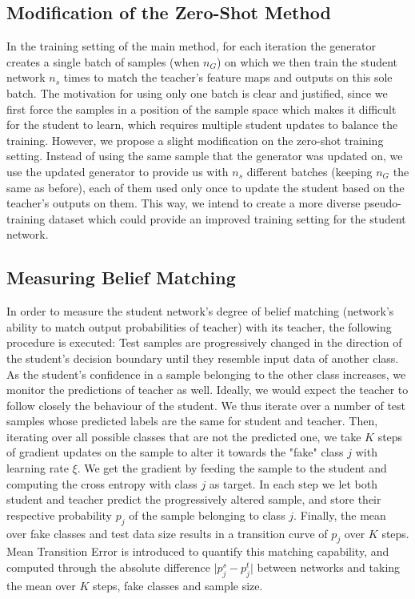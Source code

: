 \subsection{Modification of the Zero-Shot Method}\label{own}

In the training setting of the main method, for each iteration the generator creates a single batch of samples (when $n_G$) on which we then train the student network $n_s$ times to match the teacher's feature maps and outputs on this sole batch. The motivation for using only one batch is clear and justified, since we first force the samples in a position of the sample space which makes it difficult for the student to learn, which requires multiple student updates to balance the training. However, we propose a slight modification on the zero-shot training setting. Instead of using the same sample that the generator was updated on, we use the updated generator to provide us with $n_s$ different batches (keeping $n_G$ the same as before), each of them used only once to update the student based on the teacher's outputs on them. This way, we intend to create a more diverse pseudo-training dataset which could provide an improved training setting for the student network.    

\subsection{Measuring Belief Matching}\label{abm}

In order to measure the student network's degree of belief matching (network's ability to match output probabilities of teacher) with its teacher, the following procedure is executed: Test samples are progressively changed in the direction of the student's decision boundary until they resemble input data of another class. As the student's confidence in a sample belonging to the other class increases, we monitor the predictions of teacher as well. Ideally, we would expect the teacher to follow closely the behaviour of the student. We thus iterate over a number of test samples whose predicted labels are the same for student and teacher. Then, iterating over all possible classes that are not the predicted one, we take $K$ steps of gradient updates on the sample to alter it towards the "fake" class $j$ with learning rate $\xi$. We get the gradient by feeding the sample to the student and computing the cross entropy with class $j$ as target. In each step we let both student and teacher predict the progressively altered sample, and store their respective probability $p_j$ of the sample belonging to class $j$. Finally, the mean over fake classes and test data size results in a transition curve of $p_j$ over $K$ steps. Mean Transition Error is introduced to quantify this matching capability, and computed through the absolute difference $\lvert p_j^s-p_j^t\rvert$ between networks and taking the mean over $K$ steps, fake classes and sample size.
